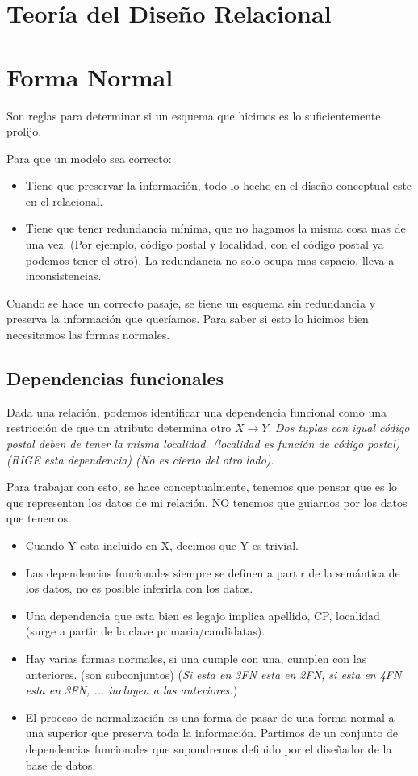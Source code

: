 \section{Teoría del Diseño Relacional}
\section{Forma Normal}

Son reglas para determinar si un esquema que hicimos es lo suficientemente prolijo.

\bigskip
Para que un modelo sea correcto:
\begin{itemize}
\item Tiene que preservar la información, todo lo hecho en el diseño conceptual este en el relacional.
\item Tiene que tener redundancia mínima, que no hagamos la misma cosa mas de una vez. (Por ejemplo, código postal y localidad, con el código postal ya podemos tener el otro). La redundancia no solo ocupa mas espacio, lleva a inconsistencias.
\end{itemize}

\bigskip
Cuando se hace un correcto pasaje, se tiene un esquema sin redundancia y preserva la información que queríamos. Para saber si esto lo hicimos bien necesitamos las formas normales.

\subsection*{Dependencias funcionales}
Dada una relación, podemos identificar una dependencia funcional como una restricción de que un atributo determina otro $X\rightarrow Y$. \textit{Dos tuplas con igual código postal deben de tener la misma localidad. (localidad es función de código postal) (RIGE esta dependencia) (No es cierto del otro lado)}. 

Para trabajar con esto, se hace conceptualmente, tenemos que pensar que es lo que representan los datos de mi relación. NO tenemos que guiarnos por los datos que tenemos.

\begin{itemize}
\item Cuando Y esta incluido en X, decimos que Y es trivial.
\item Las dependencias funcionales siempre se definen a partir de la semántica de los datos, no es posible inferirla con los datos.
\item Una dependencia que esta bien es legajo implica apellido, CP, localidad (surge a partir de la clave primaria/candidatas).
\item Hay varias formas normales, si una cumple con una, cumplen con las anteriores. (son subconjuntos) (\textit{Si esta en 3FN esta en 2FN, si esta en 4FN esta en 3FN, ... incluyen a las anteriores.})
\item El proceso de normalización es una forma de pasar de una forma normal a una superior que preserva toda la información. Partimos de un conjunto de dependencias funcionales que supondremos definido por el diseñador de la base de datos.
\end{itemize}



